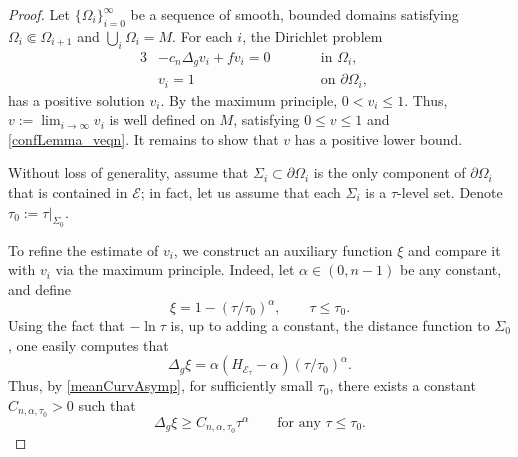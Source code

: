 \documentclass[10pt,a4paper]{amsart}
\numberwithin{equation}{section}
\def\Ecal{\mathcal{E}}
\begin{document}
\begin{proof}
    Let $\{\Omega_i\}_{i = 0}^\infty$ be a sequence of smooth, bounded domains satisfying $\Omega_i \Subset \Omega_{i+1}$ and $\bigcup_i \Omega_i = M$. For each $i$, the Dirichlet problem
    \begin{alignat}{3}
    &-c_n\Delta_g v_i + fv_i = 0\qquad &&\mbox{in } \Omega_i,&\nonumber\\
    &v_i= 1\qquad &&\mbox{on } \partial\Omega_i,&\label{viDirich}
    \end{alignat}
has a positive solution $v_i$. By the maximum principle, $0<v_i\le 1$. Thus, $v := \lim_{i\rightarrow\infty}v_i$ is well defined on $M$, satisfying $0\le v\le 1$ and \eqref{confLemma_veqn}. It remains to
show that $v$ has a positive lower bound.

Without loss of generality, assume that $\Sigma_i\subset \partial \Omega_i$ is the only component of $\partial \Omega_i$ that is contained in $\Ecal$; in fact, let us assume that each $\Sigma_i$ is a $\tau$-level set.
Denote $\tau_0:=\tau|_{\Sigma_0}$.

To refine the estimate of $v_i$, we construct an auxiliary function $\xi$ and compare it with $v_i$ via the maximum principle.
Indeed, let $\alpha\in (0,n-1)$ be any constant, and
define
\begin{equation*}%
    \xi =1 - (\tau/\tau_0)^\alpha, \qquad \tau\le \tau_0.
\end{equation*}
Using the fact that $-\ln \tau$ is, up to adding a constant, the distance
function to $\Sigma_0$, one easily computes that
\begin{equation}\label{LaplacianXi}
    \Delta_g \xi = \alpha (H_{\Ecal_\tau} - \alpha) ( \tau/\tau_0)^\alpha.
\end{equation}
Thus, by \eqref{meanCurvAsymp}, for sufficiently small $\tau_0$,
there exists a constant $C_{n,\alpha,\tau_0}>0$ such that
\[
	\Delta_g\xi \ge C_{n,\alpha,\tau_0} \tau^{\alpha}\qquad\mbox{for any } \tau\le \tau_0.
\]



\end{proof}
\end{document}
